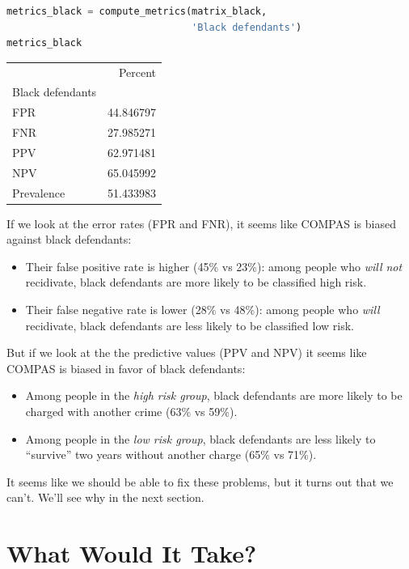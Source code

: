 \begin{lstlisting}[language=Python]
metrics_black = compute_metrics(matrix_black, 
                                'Black defendants')
metrics_black
\end{lstlisting}

\begin{tabular}{lr}
\toprule
{} &    Percent \\
Black defendants &            \\
\midrule
FPR              &  44.846797 \\
FNR              &  27.985271 \\
PPV              &  62.971481 \\
NPV              &  65.045992 \\
Prevalence       &  51.433983 \\
\bottomrule
\end{tabular}

If we look at the error rates (FPR and FNR), it seems like COMPAS is
biased against black defendants:

\begin{itemize}
\item
  Their false positive rate is higher (45\% vs 23\%): among people who
  \emph{will not} recidivate, black defendants are more likely to be
  classified high risk.
\item
  Their false negative rate is lower (28\% vs 48\%): among people who
  \emph{will} recidivate, black defendants are less likely to be
  classified low risk.
\end{itemize}

But if we look at the the predictive values (PPV and NPV) it seems like
COMPAS is biased in favor of black defendants:

\begin{itemize}
\item
  Among people in the \emph{high risk group}, black defendants are more
  likely to be charged with another crime (63\% vs 59\%).
\item
  Among people in the \emph{low risk group}, black defendants are less
  likely to ``survive'' two years without another charge (65\% vs 71\%).
\end{itemize}

It seems like we should be able to fix these problems, but it turns out
that we can't. We'll see why in the next section.

\hypertarget{what-would-it-take}{%
\section{What Would It Take?}\label{what-would-it-take}}

